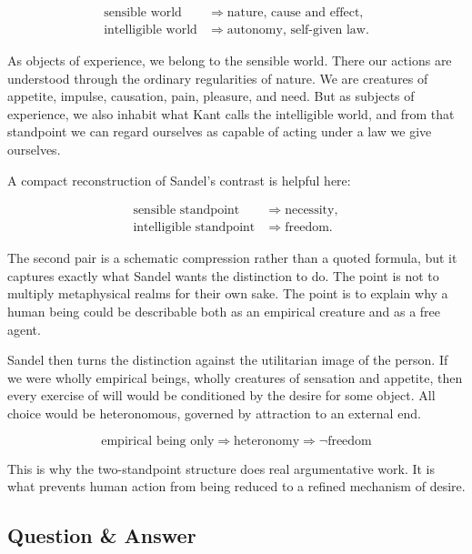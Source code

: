 \begin{align}
\text{sensible world} &\Longrightarrow \text{nature, cause and effect}, \\
\text{intelligible world} &\Longrightarrow \text{autonomy, self-given law}.
\end{align}

As objects of experience, we belong to the sensible world. There our actions are understood through the ordinary regularities of nature. We are creatures of appetite, impulse, causation, pain, pleasure, and need. But as subjects of experience, we also inhabit what Kant calls the intelligible world, and from that standpoint we can regard ourselves as capable of acting under a law we give ourselves.

A compact reconstruction of Sandel's contrast is helpful here:

\begin{align}
\text{sensible standpoint} &\Longrightarrow \text{necessity}, \\
\text{intelligible standpoint} &\Longrightarrow \text{freedom}.
\end{align}

The second pair is a schematic compression rather than a quoted formula, but it captures exactly what Sandel wants the distinction to do. The point is not to multiply metaphysical realms for their own sake. The point is to explain why a human being could be describable both as an empirical creature and as a free agent.

Sandel then turns the distinction against the utilitarian image of the person. If we were wholly empirical beings, wholly creatures of sensation and appetite, then every exercise of will would be conditioned by the desire for some object. All choice would be heteronomous, governed by attraction to an external end.

\begin{equation}
\text{empirical being only} \Longrightarrow \text{heteronomy} \Longrightarrow \neg \text{freedom}
\end{equation}

This is why the two-standpoint structure does real argumentative work. It is what prevents human action from being reduced to a refined mechanism of desire.

\subsection{Question \& Answer}

